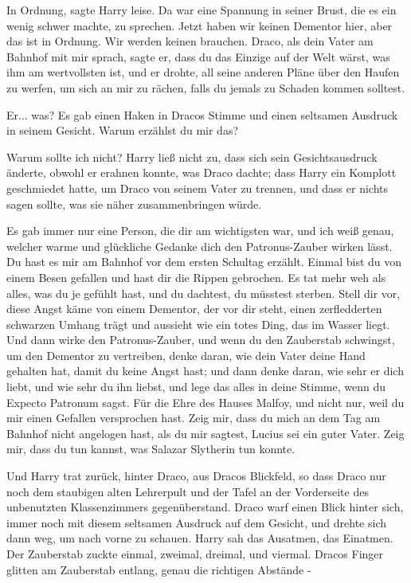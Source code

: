 \glqq{}In Ordnung\grqq{}, sagte Harry leise. Da war eine Spannung in seiner
Brust, die es ein wenig schwer machte, zu sprechen. \glqq{}Jetzt haben wir keinen
Dementor hier, aber das ist in Ordnung. Wir werden keinen brauchen. Draco, als
dein Vater am Bahnhof mit mir sprach, sagte er, dass du das Einzige auf der Welt
wärst, was ihm am wertvollsten ist, und er drohte, all seine anderen Pläne über
den Haufen zu werfen, um sich an mir zu rächen, falls du jemals zu Schaden
kommen solltest.\grqq{}

\glqq{}Er... was?\grqq{} Es gab einen Haken in Dracos Stimme und einen seltsamen
Ausdruck in seinem Gesicht. \glqq{}Warum erzählst du mir das?\grqq{}

\glqq{}Warum sollte ich nicht?\grqq{} Harry ließ nicht zu, dass sich sein
Gesichtsausdruck änderte, obwohl er erahnen konnte, was Draco dachte; dass Harry
ein Komplott geschmiedet hatte, um Draco von seinem Vater zu trennen, und dass
er nichts sagen sollte, was sie näher zusammenbringen würde.

\glqq{}Es gab immer nur eine Person, die dir am wichtigsten war, und ich weiß
genau, welcher warme und glückliche Gedanke dich den Patronus-Zauber wirken
lässt. Du hast es mir am Bahnhof vor dem ersten Schultag erzählt. Einmal bist du
von einem Besen gefallen und hast dir die Rippen gebrochen. Es tat mehr weh als
alles, was du je gefühlt hast, und du dachtest, du müsstest sterben. Stell dir
vor, diese Angst käme von einem Dementor, der vor dir steht, einen zerfledderten
schwarzen Umhang trägt und aussieht wie ein totes Ding, das im Wasser liegt. Und
dann wirke den Patronus-Zauber, und wenn du den Zauberstab schwingst, um den
Dementor zu vertreiben, denke daran, wie dein Vater deine Hand gehalten hat,
damit du keine Angst hast; und dann denke daran, wie sehr er dich liebt, und wie
sehr du ihn liebst, und lege das alles in deine Stimme, wenn du Expecto Patronum
sagst. Für die Ehre des Hauses Malfoy, und nicht nur, weil du mir einen Gefallen
versprochen hast. Zeig mir, dass du mich an dem Tag am Bahnhof nicht angelogen
hast, als du mir sagtest, Lucius sei ein guter Vater. Zeig mir, dass du tun
kannst, was Salazar Slytherin tun konnte.\grqq{}

Und Harry trat zurück, hinter Draco, aus Dracos Blickfeld, so dass Draco nur
noch dem staubigen alten Lehrerpult und der Tafel an der Vorderseite des
unbenutzten Klassenzimmers gegenüberstand. Draco warf einen Blick hinter sich,
immer noch mit diesem seltsamen Ausdruck auf dem Gesicht, und drehte sich dann
weg, um nach vorne zu schauen. Harry sah das Ausatmen, das Einatmen. Der
Zauberstab zuckte einmal, zweimal, dreimal, und viermal. Dracos Finger glitten
am Zauberstab entlang, genau die richtigen Abstände -

